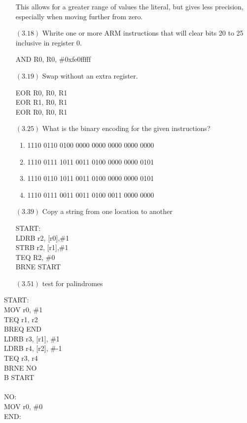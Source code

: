 \documentclass[letterpaper,10pt,titlepage]{article}
\begin{document}
\begin{enumerate}
This allows for a greater range of values the literal, but gives less precision, especially when moving further from zero.
\item[$(3.18)$] Whrite one or more ARM instructions that will clear bits 20 to 25 inclusive in register 0.

AND R0, R0, \#0xfe0fffff
\item[$(3.19)$]Swap without an extra register.

EOR R0, R0, R1 \\
EOR R1, R0, R1 \\ 
EOR R0, R0, R1 \\

\item[$(3.25)$]What is the binary encoding for the given instructions?

\begin{enumerate}
\item 1110 0110 0100 0000 0000 0000 0000 0000
\item 1110 0111 1011 0011 0100 0000 0000 0101
\item 1110 0110 1011 0011 0100 0000 0000 0101
\item 1110 0111 0011 0011 0100 0011 0000 0000
\end{enumerate}

\item[$(3.39)$] Copy a string from one location to another

START: \\
LDRB r2, [r0],\#1 \\
STRB r2, [r1],\#1 \\
TEQ R2, \#0 \\
BRNE START \\

\item[$(3.51)$]	test for palindromes

\end{enumerate}
START:\\
MOV r0, \#1 \\
TEQ r1, r2 \\
BREQ END \\
LDRB r3, [r1], \#1 \\
LDRB r4, [r2], \#-1 \\
TEQ r3, r4 \\
BRNE NO \\
B START \\
\\
NO:\\
MOV r0, \#0 \\
END: \\
\end{document}
